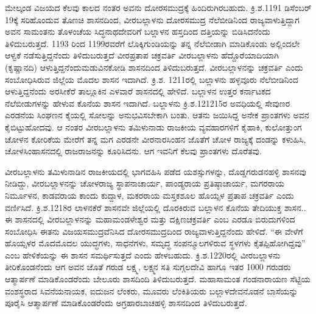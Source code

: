 ಮೇಲ್ಕಂಡ ವಿಜಯದ ಕೆಲವು ಕಾಲದ ನಂತರ ಅವನು ದೋರಸಮುದ್ರಕ್ಕೆ ಹಿಂದಿರುಗಿರಬಹುದು. ಕ್ರಿ.ಶ.1191 ಡಿಸೆಂಬರ್​ 19ಕ್ಕೆ ಸರಿಹೊಂದುವ ತೊಣಚಿ ಶಾಸನದಿಂದ, ವೀರಬಲ್ಲಾಳನು ದೋರಸಮುದ್ರ ನೆಲೆಬೀಡಿನಿಂದ ರಾಜ್ಯವಾಳುತ್ತಿದ್ದಾಗ ಅವನ ಸಾಮಂತನು ತೊಳಂಚೆಯ ಸಿದ್ಧನಾಥದೇವರಿಗೆ ಬಲ್ಲಾಳನ ಹಸ್ತದಿಂದ ದತ್ತಿಯನ್ನು ಬಿಡಿಸಿದನೆಂದು ತಿಳಿದುಬರುತ್ತದೆ. 1193 ರಿಂದ 1199ರವರೆಗೆ ಲೊಕ್ಕಿಗುಂಡಿಯನ್ನು ತನ್ನ ನೆಲೆಬೀಡಾಗಿ ಮಾಡಿಕೊಂಡು ಅಲ್ಲಿಂದಲೇ ಆಳ್ವಕೆ ನಡೆಸುತ್ತಿದ್ದನೆಂದು ತಿಳಿದುಬರುತ್ತದೆ ವೀರಪ್ರತಾಪ ಚಕ್ರವರ್ತಿ ವೀರಬಲ್ಲಾಳನು ಹೆದ್ದೊರೆಯಾದಿಯಾಗಿ (ಕೃಷ್ಣಾನದಿ) ಆಳುತ್ತಿದ್ದನೆಂದು\break ಮಡುವಿನಕೋಡಿ ಶಾಸನದಿಂದ ತಿಳಿದುಬರುತ್ತದೆ. ವೀರಬಲ್ಲಾಳನನ್ನು ಚಕ್ರವರ್ತಿ ಎಂದು ಸಂಬೋಧಿಸಿರುವ ಜಿಲ್ಲೆಯ ಮೊದಲ ಶಾಸನ ಇದಾಗಿದೆ. ಕ್ರಿ.ಶ. 1211ರಲ್ಲಿ ಬಲ್ಲಾಳನು ಹಳ್ಳವೂರು ನೆಲೆಬೀಡಿನಿಂದ ಆಳುತ್ತಿದ್ದನೆಂದು ಅರಸೀಕೆರೆ ತಾಲ್ಲೂಕಿನ ಎಳವಾರೆ ಶಾಸನದಲ್ಲಿ ಹೇಳಿದೆ. ಬಲ್ಲಾಳನ ಉತ್ತರ ಕರ್ನಾಟಕದ ನೆಲೆಬೀಡುಗಳನ್ನು ಹೇಳುವ ಕೊನೆಯ ಶಾಸನ ಇದಾಗಿದೆ. ಬಲ್ಲಾಳನು ಕ್ರಿ.ಶ.121215ರ ಅವಧಿಯಲ್ಲಿ ಸೇವುಣರ ಎರಡನೆಯ ಸಿಂಘಣನ ಕೈಯಲ್ಲಿ ಸೋಲನ್ನು ಅನುಭವಿಸಬೇಕಾಗಿ ಬಂತು. ಆತನು ಜಯಿಸಿದ್ದ ಅನೇಕ ಪ್ರಾಂತಗಳು ಅವನ ಕೈಬಿಟ್ಟುಹೋದವು. ಆ ನಂತರ ವೀರಬಲ್ಲಾಳನು ತಮಿಳುನಾಡು ರಾಜಕೀಯ ವ್ಯವಹಾರಗಳಿಗೆ ಕೈಹಾಕಿ, ಕುಲೋತ್ತುಂಗ ಚೋಳನ ಕೋರಿಕೆಯ ಮೇರೆಗೆ ತನ್ನ ಮಗ ಎರಡನೇ ವೀರನಾರಸಿಂಹನ ಜೊತೆಗೆ ಚೋಳ ರಾಜ್ಯಕ್ಕೆ ದಂಡನ್ನು ಕಳುಹಿಸಿ, ಚೋಳಸಿಂಹಾಸನದಲ್ಲಿ ರಾಜರಾಜನನ್ನು ಕೂರಿಸಿದನು. ಆಗ ಇವನಿಗೆ ಕೆಲವು ಪ್ರಾಂತಗಳು ದೊರೆತವು.

ವೀರಬಲ್ಲಾಳನು ತಮಿಳುನಾಡಿನ ರಾಜಕೀಯದಲ್ಲಿ ಭಾಗವಹಿಸಿ ಪಡೆದ ಯಶಸ್ಸುಗಳನ್ನು, ದೊಡ್ಡಗರುಡನಹಳ್ಳಿ ಶಾಸನವು ನೀಡಿದ್ದು, ವೀರಬಲ್ಲಾಳನನ್ನು ಚೋಳರಾಜ್ಯ ಸ್ಥಾಪನಾಚಾರ್ಯ, ಪಾಂಡ್ಯರಾಯ ಪ್ರತಿಷ್ಠಾಚಾರ್ಯ, ಮಗರರಾಯ ನಿರ್ಮೂಳನ, ಕಾಡವರಾಯ ಕಾಂದು ಕುದ್ದಾಳ, ಮಕರರಾಯ ಮಸ್ತಕಶೂಲ ಹೊಯ್ಸಳ ಪ್ರತಾಪ ಚಕ್ರವರ್ತಿ ಎಂದು ವರ್ಣಿಸಿದೆ. ಕ್ರಿ.ಶ.1218ರ ಲಾಳನಕೆರೆ ಶಾಸನವೇ ಜಿಲ್ಲೆಯಲ್ಲಿ ದೊರಕಿರುವ ಬಲ್ಲಾಳನ ಕೊನೆಯ ತೇದಿಯುಕ್ತ ಶಾಸನ.. ಈ ಶಾಸನದಲ್ಲಿ ವೀರಬಲ್ಲಾಳನನ್ನು ಮಹಾಮಂಡಳೇಶ್ವರ ಮತ್ತು ದಕ್ಷಿಣಚಕ್ರವರ್ತಿ ಎಂಬ ಎರಡೂ ಬಿರುದುಗಳಿಂದ ಸಂಬೋಧಿಸಿ ಈತನು ವಿಜಯಸಮುದ್ರವೆನಿಸಿದ ದೋರಸಮುದ್ರದಿಂದ ರಾಜ್ಯವಾಳುತ್ತಿದ್ದನೆಂದು ಹೇಳಿದೆ. “ಈ ವೇಳೆಗೆ ಹೊಯ್ಸಳರ ಮೊದಮೊದಲ ಯುದ್ಧಗಳು, ಸಾಧನೆಗಳು, ಸಮೃದ್ಧ ಸಂಪನ್ಮೂಲಗಳಿರುವ ಸ್ಥಳಗಳು ಕೈತಪ್ಪಿಹೋಗಿದ್ದವು” ಎಂಬ ಹೇಳಿಕೆಯನ್ನು ಈ ಶಾಸನ ಸಮರ್ಥಿಸುತ್ತದೆ ಎಂದು ಹೇಳಬಹುದು. ಕ್ರಿ.ಶ.1220ರಲ್ಲಿ ವೀರಬಲ್ಲಾಳನು ತೀರಿಕೊಂಡನೆಂದು ಆಗ ಅವನ ಜೊತೆ ಗರುಡ ಲಕ್ಷ್ಮ, ಲಕ್ಷ್ಮನ ಸತಿ ಸುಗ್ಗಲದೇವಿ ಹಾಗೂ ಇತರ 1000 ಗರುಡರು ಆತ್ಮಾರ್ಪಣೆ ಮಾಡಿಕೊಂಡರೆಂದು ಬೇಲೂರು ಶಾಸದಿಂದಿ ತಿಳಿದುಬರುತ್ತದೆ. ಮಹಾಸಾಮಂತ ಗಂಡನಾರಾಯಣ ಸೆಟ್ಟಿಯ ವಂಶಸ್ಥರಾದ ಸಿವನೆಯನಾಯಕ, ಐದುಜನ ಲೆಂಕರು, ಮೂವರು ಲೆಂಕಿತಿಯರು ಬಲ್ಲಾಳದೇವನೊಡನೆ ಬಾಸೆಯನ್ನು ಪೂರೈಸಿ ಆತ್ಮಾರ್ಪಣೆ ಮಾಡಿಕೊಂಡರೆಂದು ಅಗ್ರಹಾರಬಾಚಹಳ್ಳಿ ಶಾಸನದಿಂದ ತಿಳಿದುಬರುತ್ತದೆ. 



